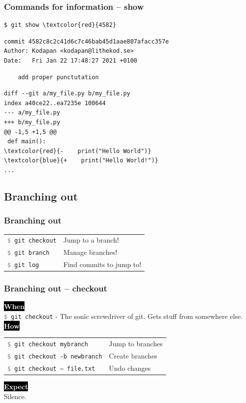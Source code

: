 \documentclass{beamer}
\newcommand{\keyword}[1]{\hspace{-1.0em}\colorbox{black}{\textcolor{white}{\textbf{#1}\vphantom{Ep}}}\vspace{0.2em}} %
\newcommand{\command}[1]{\texttt{\textcolor{gray}{\$} {#1}}}
\begin{document}
\begin{frame}[fragile]
  \frametitle{Commands for information -- show}
\begin{Verbatim}[commandchars=\\\{\}]
$ git show \textcolor{red}{4582}
\end{Verbatim}
\pause{}
\vspace{-2.5ex}
\begin{verbatim}
commit 4582c8c2c41d6c7c46bab45d1aae807afacc357e
Author: Kodapan <kodapan@lithekod.se>
Date:   Fri Jan 22 17:48:27 2021 +0100
\end{verbatim}
\vspace{-3ex}
\begin{verbatim}
    add proper punctutation
\end{verbatim}
\vspace{-2ex}
\begin{Verbatim}[commandchars=\\\{\}]
diff --git a/my_file.py b/my_file.py
index a40ce22..ea7235e 100644
--- a/my_file.py
+++ b/my_file.py
@@ -1,5 +1,5 @@
 def main():
\textcolor{red}{-    print("Hello World")}
\textcolor{blue}{+    print("Hello World!")}
...
\end{Verbatim}
\end{frame}

\subsection{Branching out}

\begin{frame}[fragile]
  \frametitle{Branching out}

  \begin{tabular}{ll}
    \command{git checkout} & Jump to a branch! \\
    \command{git branch} & Manage branches! \\
    \command{git log} & Find commits to jump to! \\
  \end{tabular}

\end{frame}

\begin{frame}
  \frametitle{Branching out -- checkout}

    \keyword{When} \\
    \command{git checkout} - The sonic screwdriver of git. Gets stuff from somewhere else. \\[1em]

    \keyword{How} \\
    \begin{tabular}{ll}
        \command{git checkout mybranch} & Jump to branches \\
        \command{git checkout -b newbranch} & Create branches \\
        \command{git checkout -- file.txt} & Undo changes \\
    \end{tabular}

    \keyword{Expect} \\
    Silence.

\end{frame}
\end{document}
